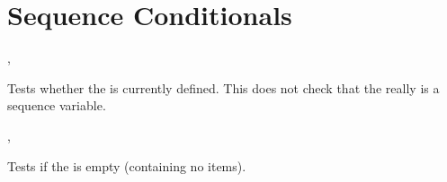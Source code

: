 \documentclass[oneside]{book}
\begin{document}

\section{Sequence Conditionals}

\begin{function}{\SeqIfExist,\SeqIfExistTF}
\begin{syntax}
 
   
\end{syntax}
Tests whether the  is currently defined.  This does not
check that the  really is a sequence variable.
\begin{demohigh}
\SeqIfExistTF {} {}
\SeqIfExistTF {} {}
\end{demohigh}
\end{function}

\begin{function}{\SeqVarIfEmpty,\SeqVarIfEmptyTF}
\begin{syntax}
 
   
\end{syntax}
Tests if the  is empty (containing no items).
\begin{demohigh}
\SeqSetFromClist {}
\SeqVarIfEmptyTF {} {}
\SeqClear \lTmpaSeq
\SeqVarIfEmptyTF {} {}
\end{demohigh}
\end{function}
\end{document}
